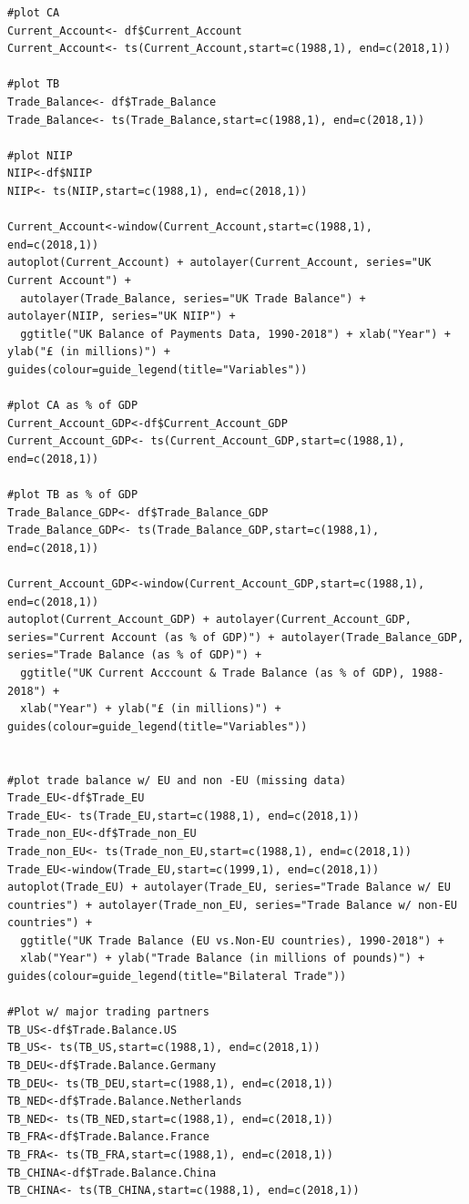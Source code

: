 \documentclass[12pt]{article}
\begin{document}
\begin{verbatim}
#plot CA
Current_Account<- df$Current_Account
Current_Account<- ts(Current_Account,start=c(1988,1), end=c(2018,1))

#plot TB
Trade_Balance<- df$Trade_Balance
Trade_Balance<- ts(Trade_Balance,start=c(1988,1), end=c(2018,1))

#plot NIIP
NIIP<-df$NIIP
NIIP<- ts(NIIP,start=c(1988,1), end=c(2018,1))

Current_Account<-window(Current_Account,start=c(1988,1), end=c(2018,1)) 
autoplot(Current_Account) + autolayer(Current_Account, series="UK Current Account") + 
  autolayer(Trade_Balance, series="UK Trade Balance") + autolayer(NIIP, series="UK NIIP") + 
  ggtitle("UK Balance of Payments Data, 1990-2018") + xlab("Year") + ylab("£ (in millions)") + guides(colour=guide_legend(title="Variables"))

#plot CA as % of GDP
Current_Account_GDP<-df$Current_Account_GDP
Current_Account_GDP<- ts(Current_Account_GDP,start=c(1988,1), end=c(2018,1))

#plot TB as % of GDP
Trade_Balance_GDP<- df$Trade_Balance_GDP
Trade_Balance_GDP<- ts(Trade_Balance_GDP,start=c(1988,1), end=c(2018,1))

Current_Account_GDP<-window(Current_Account_GDP,start=c(1988,1), end=c(2018,1)) 
autoplot(Current_Account_GDP) + autolayer(Current_Account_GDP, series="Current Account (as % of GDP)") + autolayer(Trade_Balance_GDP, series="Trade Balance (as % of GDP)") + 
  ggtitle("UK Current Acccount & Trade Balance (as % of GDP), 1988-2018") + 
  xlab("Year") + ylab("£ (in millions)") + guides(colour=guide_legend(title="Variables"))


#plot trade balance w/ EU and non -EU (missing data)
Trade_EU<-df$Trade_EU
Trade_EU<- ts(Trade_EU,start=c(1988,1), end=c(2018,1))
Trade_non_EU<-df$Trade_non_EU
Trade_non_EU<- ts(Trade_non_EU,start=c(1988,1), end=c(2018,1))
Trade_EU<-window(Trade_EU,start=c(1999,1), end=c(2018,1)) 
autoplot(Trade_EU) + autolayer(Trade_EU, series="Trade Balance w/ EU countries") + autolayer(Trade_non_EU, series="Trade Balance w/ non-EU countries") + 
  ggtitle("UK Trade Balance (EU vs.Non-EU countries), 1990-2018") + 
  xlab("Year") + ylab("Trade Balance (in millions of pounds)") + guides(colour=guide_legend(title="Bilateral Trade"))

#Plot w/ major trading partners
TB_US<-df$Trade.Balance.US
TB_US<- ts(TB_US,start=c(1988,1), end=c(2018,1))
TB_DEU<-df$Trade.Balance.Germany
TB_DEU<- ts(TB_DEU,start=c(1988,1), end=c(2018,1))
TB_NED<-df$Trade.Balance.Netherlands
TB_NED<- ts(TB_NED,start=c(1988,1), end=c(2018,1))
TB_FRA<-df$Trade.Balance.France
TB_FRA<- ts(TB_FRA,start=c(1988,1), end=c(2018,1))
TB_CHINA<-df$Trade.Balance.China
TB_CHINA<- ts(TB_CHINA,start=c(1988,1), end=c(2018,1))


\end{verbatim}
\end{document}
